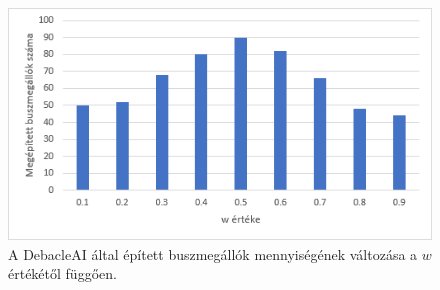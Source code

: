 \begin{figure}
	\centering
	\includegraphics[width=\textwidth]{images/wallomas.png}
	\caption{A DebacleAI által épített buszmegállók mennyiségének változása a $w$ értékétől függően.}
	\label{fig:wmegallok}
\end{figure}

